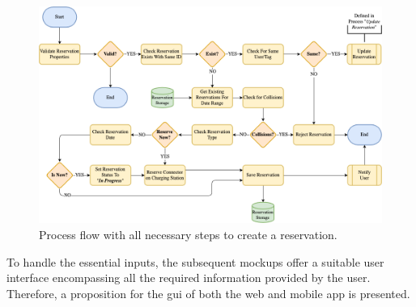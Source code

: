 \begin{figure}[h]
    \centering
    \includegraphics[scale=0.4]{resources/images/main/5_design/processes/ReservationCreate.png}
    \caption{Process flow with all necessary steps to create a reservation.}
    \label{fig:create-reservation-flowchart}
\end{figure}

\noindent To handle the essential inputs, the subsequent mockups offer a suitable user interface encompassing all the required information provided by the user. Therefore, a proposition for the \acrshort{gui} of both the web and mobile app is presented.

